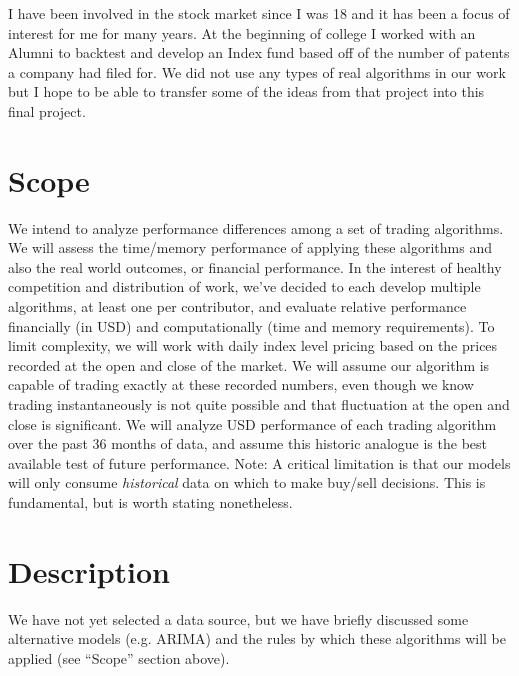 \documentclass[12pt,english]{article}
\begin{document}
I have been involved in the stock market since I was 18 and it has been a focus of interest for me for many years. At the beginning of college I worked with an Alumni to backtest and develop an Index fund based off of the number of patents a company had filed for. We did not use any types of real algorithms in our work but I hope to be able to transfer some of the ideas from that project into this final project.


\section*{Scope}
We intend to analyze performance differences among a set of trading algorithms. We will assess the time/memory performance of applying these algorithms and also the real world outcomes, or financial performance. In the interest of healthy competition and distribution of work, we’ve decided to each develop multiple algorithms, at least one per contributor, and evaluate relative performance financially (in USD) and computationally (time and memory requirements).
\newline\newline
To limit complexity, we will work with daily index level pricing based on the prices recorded at the open and close of the market. We will assume our algorithm is capable of trading exactly at these recorded numbers, even though we know trading instantaneously is not quite possible and that fluctuation at the open and close is significant. We will analyze USD performance of each trading algorithm over the past 36 months of data, and assume this historic analogue is the best available test of future performance.
\newline\newline
Note: A critical limitation is that our models will only consume \textit{historical} data on which to make buy/sell decisions. This is fundamental, but is worth stating nonetheless.

\section*{Description}
We have not yet selected a data source, but we have briefly discussed some alternative models (e.g. ARIMA) and the rules by which these algorithms will be applied (see ``Scope'' section above).

\end{document}
